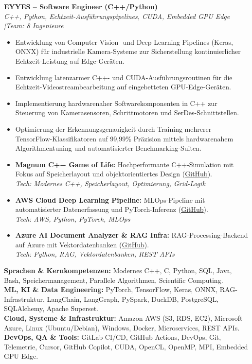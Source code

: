 \documentclass[10pt,a4paper]{article}
\begin{document}
\vspace{0.15cm}
\textbf{EYYES -- Software Engineer (C++/Python)} \\
\textit{C++, Python, Echtzeit-Ausführungspipelines, CUDA, Embedded GPU Edge \quad|\quad Team: 8 Ingenieure}
\begin{itemize}
    \item Entwicklung von Computer Vision- und Deep Learning-Pipelines (Keras, ONNX) für industrielle Kamera-Systeme zur Sicherstellung kontinuierlicher Echtzeit-Leistung auf Edge-Geräten.
    \item Entwicklung latenzarmer C++- und CUDA-Ausführungsroutinen für die Echtzeit-Videostreambearbeitung auf eingebetteten GPU-Edge-Geräten.
    \item Implementierung hardwarenaher Softwarekomponenten in C++ zur Steuerung von Kamerasensoren, Schrittmotoren und SerDes-Schnittstellen.
    \item Optimierung der Erkennungsgenauigkeit durch Training mehrerer TensorFlow-Klassifikatoren auf 99,99\% Präzision mittels hardwarenahem Algorithmentuning und automatisierter Benchmarking-Suiten.
\end{itemize}


\begin{itemize}
    \item \textbf{Magnum C++ Game of Life:} Hochperformante C++-Simulation mit Fokus auf Speicherlayout und objektorientiertes Design (\href{\meinGithub}{GitHub}).\\
    \textit{Tech: Modernes C++, Speicherlayout, Optimierung, Grid-Logik}
    \item \textbf{AWS Cloud Deep Learning Pipeline:} MLOps-Pipeline mit automatisierter Datenerfassung und PyTorch-Inferenz (\href{\meinGithub}{GitHub}).\\
    \textit{Tech: AWS, Python, PyTorch, MLOps}
    \item \textbf{Azure AI Document Analyzer \& RAG Infra:} RAG-Processing-Backend auf Azure mit Vektordatenbanken (\href{\meinGithub}{GitHub}).\\
    \textit{Tech: Python, RAG, Vektordatenbanken, REST APIs}
\end{itemize}


\textbf{Sprachen \& Kernkompetenzen:} Modernes C++, C, Python, SQL, Java, Bash, Speichermanagement, Parallele Algorithmen, Scientific Computing.\\[0.05em]
\textbf{ML, KI \& Data Engineering:} PyTorch, TensorFlow, Keras, ONNX, RAG-Infrastruktur, LangChain, LangGraph, PySpark, DuckDB, PostgreSQL, SQLAlchemy, Apache Superset.\\[0.05em]
\textbf{Cloud, Systeme \& Infrastruktur:} Amazon AWS (S3, RDS, EC2), Microsoft Azure, Linux (Ubuntu/Debian), Windows, Docker, Microservices, REST APIs.\\[0.05em]
\textbf{DevOps, QA \& Tools:} GitLab CI/CD, GitHub Actions, DevOps, Git, Telemetrie, Cursor, GitHub Copilot, CUDA, OpenCL, OpenMP, MPI, Embedded GPU Edge.
\end{document}
